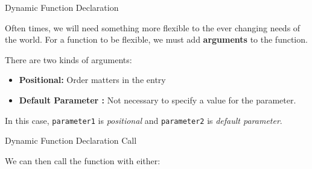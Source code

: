 \begin{frame}[fragile]{Dynamic Function Declaration}

Often times, we will need something more flexible to the ever changing
needs of the world. For a function to be flexible, we must add
\textbf{arguments} to the function.

There are two kinds of arguments:

\begin{itemize}
\tightlist
\item
  \textbf{Positional:} Order matters in the entry
\item
  \textbf{Default Parameter :} Not necessary to specify a value for the
  parameter.
\end{itemize}

\begin{Shaded}
\begin{Highlighting}[]
\StringTok{ } \NormalTok{)  \{}
\NormalTok{\}}
\end{Highlighting}
\end{Shaded}

In this case, \texttt{parameter1} is \emph{positional} and
\texttt{parameter2} is \emph{default parameter}.

\end{frame}

\begin{frame}[fragile]{Dynamic Function Declaration Call}

We can then call the function with either:

\begin{Shaded}
\begin{Highlighting}[]

\end{Highlighting}
\end{Shaded}

\end{frame}

